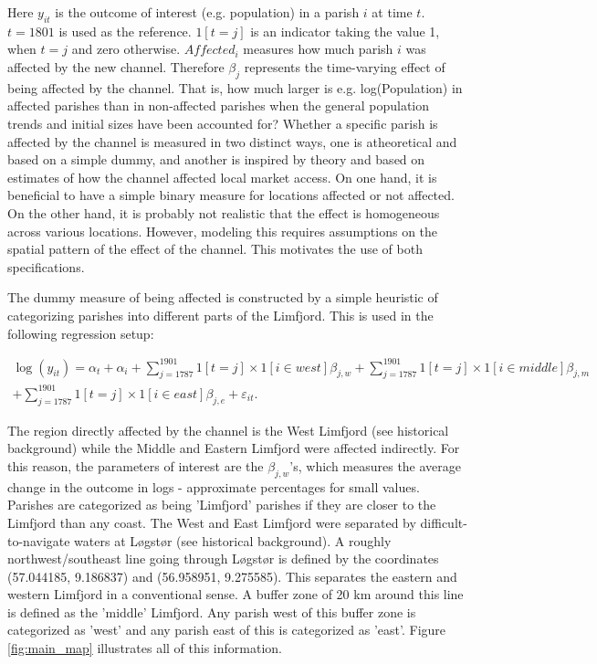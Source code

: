 \documentclass[11pt]{article}
\begin{document}
Here $y_{it}$ is the outcome of interest (e.g. population) in a parish $i$ at time $t$. $t=1801$ is used as the reference. $1[t=j]$ is an indicator taking the value 1, when $t=j$ and zero otherwise. $Affected_{i}$ measures how much parish $i$ was affected by the new channel. Therefore $\beta_j$ represents the time-varying effect of being affected by the channel. That is, how much larger is e.g. log(Population) in affected parishes than in non-affected parishes when the general population trends and initial sizes have been accounted for? Whether a specific parish is affected by the channel is measured in two distinct ways, one is atheoretical and based on a simple dummy, and another is inspired by theory and based on estimates of how the channel affected local market access. On one hand, it is beneficial to have a simple binary measure for locations affected or not affected. On the other hand, it is probably not realistic that the effect is homogeneous across various locations. However, modeling this requires assumptions on the spatial pattern of the effect of the channel. This motivates the use of both specifications.

The dummy measure of being affected is constructed by a simple heuristic of categorizing parishes into different parts of the Limfjord. This is used in the following regression setup: 

\begin{equation}
\label{eq:eq502}
\begin{split}
\log(y_{it})= \alpha_t + \alpha_i + \sum_{j=1787}^{1901} 1[t=j] \times 1[i\in west]\beta_{j,w} + \sum_{j=1787}^{1901} 1[t=j] \times 1[i\in middle]\beta_{j,m} \\
+ \sum_{j=1787}^{1901} 1[t=j] \times 1[i\in east]\beta_{j,e} + \varepsilon_{it}.
\end{split}
\end{equation}

The region directly affected by the channel is the West Limfjord (see historical background) while the Middle and Eastern Limfjord were affected indirectly. For this reason, the parameters of interest are the $\beta_{j,w}$'s, which measures the average change in the outcome in logs - approximate percentages for small values. Parishes are categorized as being 'Limfjord' parishes if they are closer to the Limfjord than any coast. The West and East Limfjord were separated by difficult-to-navigate waters at Løgstør (see historical background). A roughly northwest/southeast line going through Løgstør is defined by the coordinates (57.044185, 9.186837) and (56.958951, 9.275585). This separates the eastern and western Limfjord in a conventional sense. A buffer zone of 20 km around this line is defined as the 'middle' Limfjord. Any parish west of this buffer zone is categorized as 'west' and any parish east of this is categorized as 'east'. Figure \ref{fig:main_map} illustrates all of this information.
\end{document}
